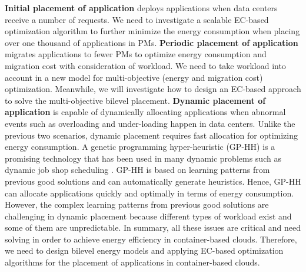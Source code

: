   \textbf{Initial placement of application} deploys applications when data centers receive a number of requests. We need to investigate a scalable EC-based optimization algorithm to further minimize the energy consumption when placing over one thousand of applications in PMs. 
\textbf{Periodic placement of application} migrates applications to fewer PMs to optimize energy consumption and migration cost with consideration of workload. We need to take workload into account in a new model for multi-objective (energy and migration cost) optimization. 
Meanwhile, we will investigate how to design an EC-based approach to solve the multi-objective bilevel placement. 
\textbf{Dynamic placement of application} is capable of dynamically allocating applications when abnormal events such as overloading and under-loading \cite{Beloglazov:2013ht} happen in data centers. Unlike the previous two scenarios, dynamic placement requires fast allocation for optimizing energy consumption. A genetic programming \cite{Banzhaf:1998wc} hyper-heuristic (GP-HH) is a promising technology that
has been used in many dynamic problems such as dynamic job shop scheduling \cite{Nguyen:2014eu}. GP-HH is based on learning patterns from previous good solutions and can automatically generate heuristics. Hence,  GP-HH can allocate applications quickly and optimally in terms of energy consumption. However, the complex learning patterns from previous good solutions are challenging in dynamic placement because different types of workload exist and some of them are unpredictable. In summary, all these issues are critical and need solving in order to achieve energy efficiency in container-based clouds. Therefore, we need to design bilevel energy models and applying EC-based optimization algorithms for the placement of applications in container-based clouds. 



